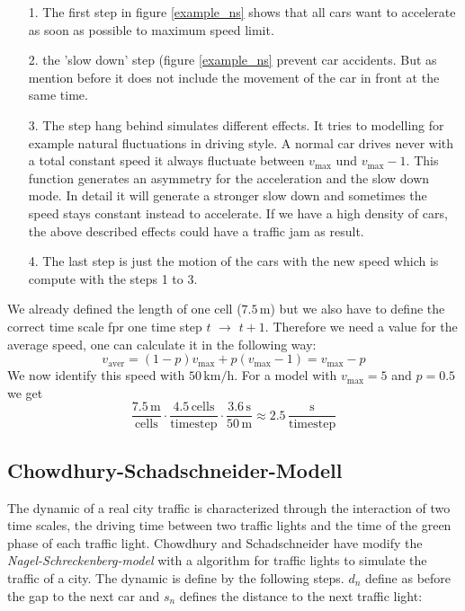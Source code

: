 \documentclass[11pt]{article}
\begin{document}
\begin{itemize}
\item[1.] The first step in figure \ref{example_ns} shows that all cars want to accelerate as soon as possible to maximum speed limit.
\item[2.] the 'slow down' step (figure \ref{example_ns} prevent car accidents. But as mention before it does not include the movement of the car in front at the same time.
\item[3.] The step hang behind simulates different effects. It tries to modelling for example natural fluctuations in driving style. A normal car drives never with a total constant speed it always fluctuate between $v_\mathrm{max}$ und $v_\mathrm{max}-1$. This function generates an asymmetry for the acceleration and the slow down mode. In detail it will generate a stronger slow down and sometimes the speed stays constant instead to accelerate. If we have a high density of cars, the above described effects could have a traffic jam as result.
\item[4.] The last step is just the motion of the cars with the new speed which is compute with the steps 1 to 3.

\end{itemize}

We already defined the length of one cell ($7.5\,\mathrm{m}$) but we also have to define the correct time scale fpr one time step $t$ $\rightarrow$ $t+1$. Therefore we need a value for the average speed, one can calculate it in the following way:\\

\begin{equation}
v_\mathrm{aver}=(1-p)v_\mathrm{max} + p(v_\mathrm{max}-1)=v_\mathrm{max}-p
\label{average_speed}
\end{equation}
We now identify this speed with $50\,\mathrm{km/h}$. For a model with $v_\mathrm{max}=5$ and $p=0.5$ we get\\
\begin{equation}
\frac{7.5\,\mathrm{m}}{\mathrm{cells}}\cdot\frac{4.5\,\mathrm{cells}}{\mathrm{timestep}} \cdot \frac{3.6\,\mathrm{s}}{50\,\mathrm{m}}\approx 2.5\,\frac{\mathrm{s}}{\mathrm{timestep}}
\end{equation}

\subsection{Chowdhury-Schadschneider-Modell}

The dynamic of a real city traffic is characterized through the interaction of two time scales, the driving time between two traffic lights and the time of the green phase of each traffic light. Chowdhury and Schadschneider have modify the \textit{Nagel-Schreckenberg-model} with a algorithm for traffic lights to simulate the traffic of a city. The dynamic is define by the following steps. $d_n$ define as before the gap to the next car and $s_n$ defines the distance to the next traffic light:\\
\end{document}
